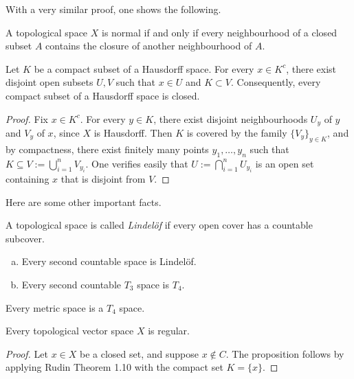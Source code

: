 With a very similar proof, one shows the following.
\begin{proposition}
	A topological space $X$ is normal if and only if every neighbourhood of a closed subset $A$ contains the closure of another neighbourhood of $A$.
\end{proposition}

\begin{proposition}
	Let $K$ be a compact subset of a Hausdorff space. For every $x \in K^c$, there exist disjoint open subsets $U, V$ such that $x \in U$ and $K \subset V$. Consequently, every compact subset of a Hausdorff space is closed.
\end{proposition}

\begin{proof}
	Fix $x \in K^c$. For every $y \in K$, there exist disjoint neighbourhoods $U_y$ of $y$ and $V_y$ of $x$, since $X$ is Hausdorff. Then $K$ is covered by the family $\{V_y\}_{y \in K}$, and by compactness, there exist finitely many points $y_1, \ldots, y_n$ such that $K \subseteq V := \bigcup_{i=1}^n V_{y_i}$. One verifies easily that $U := \bigcap_{i=1}^n U_{y_i}$ is an open set containing $x$ that is disjoint from $V$.
\end{proof}

Here are some other important facts.
\begin{proposition}
	A topological space is called \emph{Lindel\"{o}f} if every open cover has a countable subcover.
	\begin{enumerate}[(a)]
		\item Every second countable space is Lindel\"{o}f.
		\item Every second countable $T_3$ space is $T_4$.
	\end{enumerate}
\end{proposition}

\begin{proposition}
	Every metric space is a $T_4$ space.
\end{proposition}

\begin{proposition}
	Every topological vector space $X$ is regular.
\end{proposition}

\begin{proof}
	Let $x \in X$ be a closed set, and suppose $x \not\in C$. The proposition follows by applying Rudin Theorem 1.10 with the compact set $K = \{x\}$.
\end{proof}

